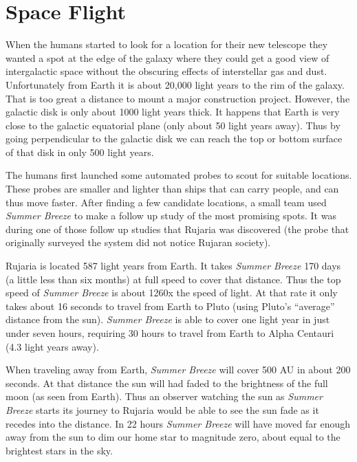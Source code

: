 
\chapter{Space Flight}

When the humans started to look for a location for their new telescope they wanted a spot at the
edge of the galaxy where they could get a good view of intergalactic space without the obscuring
effects of interstellar gas and dust. Unfortunately from Earth it is about 20,000 light years to
the rim of the galaxy. That is too great a distance to mount a major construction project.
However, the galactic disk is only about 1000 light years thick. It happens that Earth is very
close to the galactic equatorial plane (only about 50 light years away). Thus by going
perpendicular to the galactic disk we can reach the top or bottom surface of that disk in only
500 light years.

The humans first launched some automated probes to scout for suitable locations. These probes
are smaller and lighter than ships that can carry people, and can thus move faster. After
finding a few candidate locations, a small team used \textit{Summer Breeze} to make a follow up
study of the most promising spots. It was during one of those follow up studies that Rujaria was
discovered (the probe that originally surveyed the system did not notice Rujaran society).

Rujaria is located 587 light years from Earth. It takes \textit{Summer Breeze} 170 days (a
little less than six months) at full speed to cover that distance. Thus the top speed of
\textit{Summer Breeze} is about 1260x the speed of light. At that rate it only takes about 16
seconds to travel from Earth to Pluto (using Pluto's ``average'' distance from the sun).
\textit{Summer Breeze} is able to cover one light year in just under seven hours, requiring 30
hours to travel from Earth to Alpha Centauri (4.3 light years away).

When traveling away from Earth, \textit{Summer Breeze} will cover 500 AU in about 200 seconds.
At that distance the sun will had faded to the brightness of the full moon (as seen from Earth).
Thus an observer watching the sun as \textit{Summer Breeze} starts its journey to Rujaria would
be able to see the sun fade as it recedes into the distance. In 22 hours \textit{Summer Breeze}
will have moved far enough away from the sun to dim our home star to magnitude zero, about equal
to the brightest stars in the sky.

